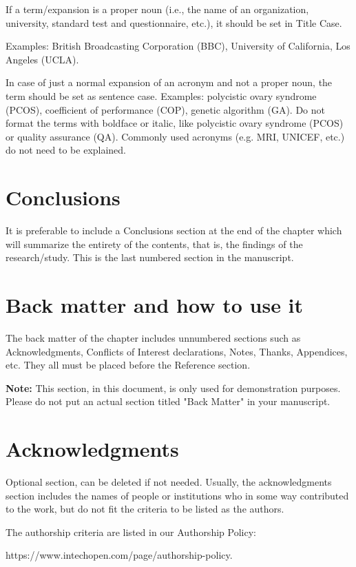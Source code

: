 \documentclass[numbers,sort&compress]{IntechOpen-Book}%
\begin{document}
If a term/expansion is a proper noun (i.e., the name of an organization, university, standard test and questionnaire, etc.), it should be set in Title Case.

Examples: British Broadcasting Corporation (BBC), University of California, Los Angeles (UCLA).

In case of just a normal expansion of an acronym and not a proper noun, the term should be set as sentence case. Examples: polycistic ovary syndrome (PCOS), coefficient of performance (COP), genetic algorithm (GA).
Do not format the terms with boldface or italic, like polycistic ovary syndrome (PCOS) or quality assurance (QA). Commonly used acronyms (e.g. MRI, UNICEF, etc.) do not need to be explained.

\begin{backmatter}
\section{Conclusions}
It is preferable to include a Conclusions section at the end of the chapter which will summarize the entirety of the contents, that is, the findings of the research/study. This is the last numbered section in the manuscript.

\section*{Back matter and how to use it}

The back matter of the chapter includes unnumbered sections such as Acknowledgments, Conflicts of Interest declarations, Notes, Thanks, Appendices, etc. They all must be placed before the Reference section.

\textbf{Note:} This section, in this document, is only used for demonstration purposes. Please do not put an actual section titled "Back Matter" in your manuscript.

\section*{Acknowledgments}
Optional section, can be deleted if not needed. Usually, the acknowledgments section includes the names of people or institutions who in some way contributed to the work, but do not fit the criteria to be listed as the authors.

The authorship criteria are listed in our Authorship Policy: 

https://www.intechopen.com/page/authorship-policy.


\end{backmatter}
\end{document}
